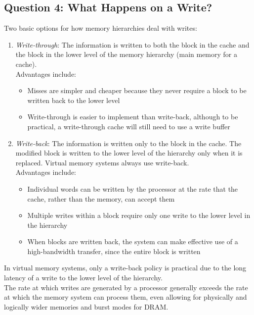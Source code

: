 \documentclass[12pt]{article}
\theoremstyle{definition}
\begin{document}
  \subsection{Question 4: What Happens on a Write?}
  Two basic options for how memory hierarchies deal with writes:
  \begin{enumerate}
    \item \emph{Write-through}: The information is written to both the block in the cache and the block in the lower level of the memory hierarchy (main memory for a cache). \\
    Advantages include:
    \begin{itemize}
      \item Misses are simpler and cheaper because they never require a block to be written back to the lower level
      \item Write-through is easier to implement than write-back, although to be practical, a write-through cache will still need to use a write buffer
    \end{itemize}
    \item \emph{Write-back}: The information is written only to the block in the cache.
    The modified block is written to the lower level of the hierarchy only when it is replaced.
    Virtual memory systems always use write-back. \\
    Advantages include:
    \begin{itemize}
      \item Individual words can be written by the processor at the rate that the cache, rather than the memory, can accept them
      \item Multiple writes within a block require only one write to the lower level in the hierarchy
      \item When blocks are written back, the system can make effective use of a high-bandwidth transfer, since the entire block is written
    \end{itemize}
  \end{enumerate}

  In virtual memory systems, only a write-back policy is practical due to the long latency of a write to the lower level of the hierarchy. \\

  The rate at which writes are generated by a processor generally exceeds the rate at which the memory system can process them, even allowing for physically and logically wider memories and burst modes for DRAM.
\end{document}
